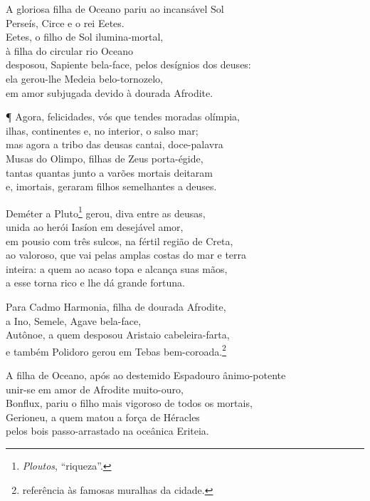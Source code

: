 \quad{}A gloriosa filha de Oceano pariu ao incansável Sol\\
Perseís, Circe e o rei Eetes.\\
Eetes, o filho de Sol ilumina-mortal,\\
à filha do circular rio Oceano\\
desposou, Sapiente bela-face, pelos desígnios dos deuses: \\
ela gerou-lhe Medeia belo-tornozelo,\\
em amor subjugada devido à dourada Afrodite.

¶ Agora, felicidades, vós que tendes moradas olímpia,\\
ilhas, continentes e, no interior, o salso mar;\\
mas agora a tribo das deusas cantai, doce-palavra \\
Musas do Olimpo, filhas de Zeus porta-égide,\\
tantas quantas junto a varões mortais deitaram\\
e, imortais, geraram filhos semelhantes a deuses.

\quad{}Deméter a Pluto\footnote{\emph{Ploutos}, ``riqueza''.} gerou, diva entre as deusas,\\
unida ao herói Iasíon em desejável amor, \\
em pousio com três sulcos, na fértil região de Creta,\\
ao valoroso, que vai pelas amplas costas do mar e terra\\
inteira: a quem ao acaso topa e alcança suas mãos,\\
a esse torna rico e lhe dá grande fortuna.

\quad{}Para Cadmo Harmonia, filha de dourada Afrodite, \\
a Ino, Semele, Agave bela-face,\\
Autônoe, a quem desposou Aristaio cabeleira-farta,\\
e também Polidoro gerou em Tebas bem-coroada.\footnote{referência às famosas muralhas da cidade.}

\quad{}A filha de Oceano, após ao destemido Espadouro \qb{}ânimo-potente\\
unir-se em amor de Afrodite muito-ouro, \\
Bonflux, pariu o filho mais vigoroso de todos os mortais,\\
Gerioneu, a quem matou a força de Héracles\\
pelos bois passo-arrastado na oceânica Eriteia.

